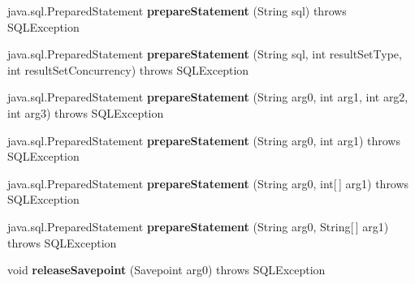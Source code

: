 \begin{DoxyCompactItemize}
java.\+sql.\+Prepared\+Statement {\bfseries prepare\+Statement} (String sql)  throws S\+Q\+L\+Exception 
\item 
\mbox{\label{classcom_1_1mysql_1_1cj_1_1jdbc_1_1_connection_wrapper_a62fc8536796d72dde86b74ff39bb0837}} 
java.\+sql.\+Prepared\+Statement {\bfseries prepare\+Statement} (String sql, int result\+Set\+Type, int result\+Set\+Concurrency)  throws S\+Q\+L\+Exception 
\item 
\mbox{\label{classcom_1_1mysql_1_1cj_1_1jdbc_1_1_connection_wrapper_ae98cd37ee7c93be928a65e6bd7cde091}} 
java.\+sql.\+Prepared\+Statement {\bfseries prepare\+Statement} (String arg0, int arg1, int arg2, int arg3)  throws S\+Q\+L\+Exception 
\item 
\mbox{\label{classcom_1_1mysql_1_1cj_1_1jdbc_1_1_connection_wrapper_a3a841e566b2d041242b0fefe178c87c1}} 
java.\+sql.\+Prepared\+Statement {\bfseries prepare\+Statement} (String arg0, int arg1)  throws S\+Q\+L\+Exception 
\item 
\mbox{\label{classcom_1_1mysql_1_1cj_1_1jdbc_1_1_connection_wrapper_a933a2f7a3efc351d595b64a74216d473}} 
java.\+sql.\+Prepared\+Statement {\bfseries prepare\+Statement} (String arg0, int\mbox{[}$\,$\mbox{]} arg1)  throws S\+Q\+L\+Exception 
\item 
\mbox{\label{classcom_1_1mysql_1_1cj_1_1jdbc_1_1_connection_wrapper_ad6c4ba01252963816830370b200568fe}} 
java.\+sql.\+Prepared\+Statement {\bfseries prepare\+Statement} (String arg0, String\mbox{[}$\,$\mbox{]} arg1)  throws S\+Q\+L\+Exception 
\item 
\mbox{\label{classcom_1_1mysql_1_1cj_1_1jdbc_1_1_connection_wrapper_a9d10ffe3fb8bf01464f4ef55c1eb936d}} 
void {\bfseries release\+Savepoint} (Savepoint arg0)  throws S\+Q\+L\+Exception 
\item 
\mbox{\label{classcom_1_1mysql_1_1cj_1_1jdbc_1_1_connection_wrapper_ad25f41ed3814457e349bdf1663425ac2}} 

\end{DoxyCompactItemize}
